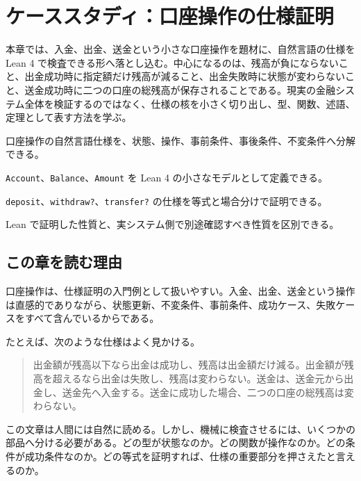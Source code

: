 \chapter{ケーススタディ：口座操作の仕様証明}
\label{chap:account-spec-proof}

\begin{chapterabstract}
本章では、入金、出金、送金という小さな口座操作を題材に、自然言語の仕様を Lean 4 で検査できる形へ落とし込む。中心になるのは、残高が負にならないこと、出金成功時に指定額だけ残高が減ること、出金失敗時に状態が変わらないこと、送金成功時に二つの口座の総残高が保存されることである。現実の金融システム全体を検証するのではなく、仕様の核を小さく切り出し、型、関数、述語、定理として表す方法を学ぶ。
\end{chapterabstract}

\begin{learninggoals}
\item 口座操作の自然言語仕様を、状態、操作、事前条件、事後条件、不変条件へ分解できる。
\item \texttt{Account}、\texttt{Balance}、\texttt{Amount} を Lean 4 の小さなモデルとして定義できる。
\item \texttt{deposit}、\texttt{withdraw?}、\texttt{transfer?} の仕様を等式と場合分けで証明できる。
\item Lean で証明した性質と、実システム側で別途確認すべき性質を区別できる。
\end{learninggoals}

\section{この章を読む理由}

口座操作は、仕様証明の入門例として扱いやすい。入金、出金、送金という操作は直感的でありながら、状態更新、不変条件、事前条件、成功ケース、失敗ケースをすべて含んでいるからである。

たとえば、次のような仕様はよく見かける。

\begin{quote}
出金額が残高以下なら出金は成功し、残高は出金額だけ減る。出金額が残高を超えるなら出金は失敗し、残高は変わらない。送金は、送金元から出金し、送金先へ入金する。送金に成功した場合、二つの口座の総残高は変わらない。
\end{quote}

この文章は人間には自然に読める。しかし、機械に検査させるには、いくつかの部品へ分ける必要がある。どの型が状態なのか。どの関数が操作なのか。どの条件が成功条件なのか。どの等式を証明すれば、仕様の重要部分を押さえたと言えるのか。

